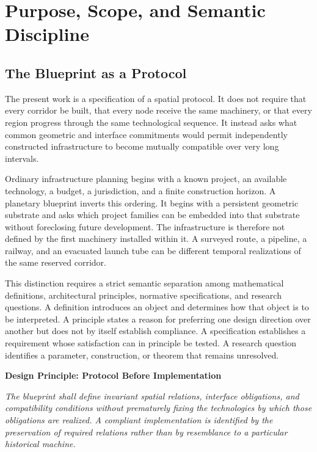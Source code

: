 \documentclass[11pt,fleqn]{book}
\numberwithin{equation}{chapter}
\newenvironment{principle}[1]
  {\begin{principleEnv}
   \noindent\textbf{Design Principle: #1}\par\smallskip\itshape}
  {\end{principleEnv}}
\theoremstyle{plain}
\theoremstyle{definition}
\theoremstyle{remark}
\begin{document}
\chapter{Purpose, Scope, and Semantic Discipline}

\section{The Blueprint as a Protocol}

The present work is a specification of a spatial protocol. It does not require that every corridor be built, that every node receive the same machinery, or that every region progress through the same technological sequence. It instead asks what common geometric and interface commitments would permit independently constructed infrastructure to become mutually compatible over very long intervals.

Ordinary infrastructure planning begins with a known project, an available technology, a budget, a jurisdiction, and a finite construction horizon. A planetary blueprint inverts this ordering. It begins with a persistent geometric substrate and asks which project families can be embedded into that substrate without foreclosing future development. The infrastructure is therefore not defined by the first machinery installed within it. A surveyed route, a pipeline, a railway, and an evacuated launch tube can be different temporal realizations of the same reserved corridor.

This distinction requires a strict semantic separation among mathematical definitions, architectural principles, normative specifications, and research questions. A definition introduces an object and determines how that object is to be interpreted. A principle states a reason for preferring one design direction over another but does not by itself establish compliance. A specification establishes a requirement whose satisfaction can in principle be tested. A research question identifies a parameter, construction, or theorem that remains unresolved.

\begin{principle}{Protocol Before Implementation}
The blueprint shall define invariant spatial relations, interface obligations, and compatibility conditions without prematurely fixing the technologies by which those obligations are realized. A compliant implementation is identified by the preservation of required relations rather than by resemblance to a particular historical machine.
\end{principle}
\end{document}
